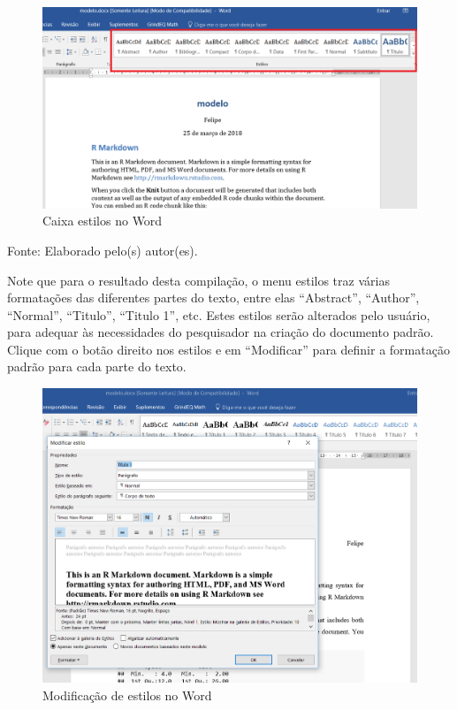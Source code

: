 \documentclass[12pt,brazil,oneside]{book}
\begin{document}
\begin{figure}[H]

{\centering \includegraphics[width=0.8\linewidth]{rmarkestilos} 

}

\caption{Caixa estilos no Word}\label{fig:rmarkestilos}
\end{figure}

Fonte: Elaborado pelo(s) autor(es).

Note que para o resultado desta compilação, o menu estilos traz várias formatações das diferentes partes do texto, entre elas ``Abstract'', ``Author'', ``Normal'', ``Titulo'', ``Titulo 1'', etc. Estes estilos serão alterados pelo usuário, para adequar às necessidades do pesquisador na criação do documento padrão. Clique com o botão direito nos estilos e em ``Modificar'' para definir a formatação padrão para cada parte do texto.

\begin{figure}[H]

{\centering \includegraphics[width=0.8\linewidth]{rmarkestilos1} 

}

\caption{Modificação de estilos no Word}\label{fig:rmarkestilos1}
\end{figure}
\end{document}
